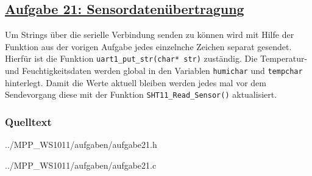 \subsection*
{\href{http://cst.mi.fu-berlin.de/intern/19606-P-MPP/Aufgaben/040702.html}
{Aufgabe 21: Sensordatenübertragung}}
Um Strings über die serielle Verbindung senden zu können wird mit Hilfe der Funktion aus der vorigen Aufgabe jedes einzelnche Zeichen separat gesendet. Hierfür ist die Funktion \texttt{uart1\_put\_str(char* str)} zuständig. Die Temperatur- und Feuchtigkeitsdaten werden global in den Variablen \texttt{humichar} und \texttt{tempchar} hinterlegt. Damit die Werte aktuell bleiben werden jedes mal vor dem Sendevorgang diese mit der Funktion \texttt{SHT11\_Read\_Sensor()} aktualisiert.

\subsubsection*{Quelltext}

{../MPP_WS1011/aufgaben/aufgabe21.h}


{../MPP_WS1011/aufgaben/aufgabe21.c}
